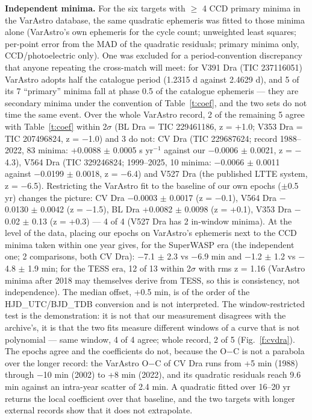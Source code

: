 \documentclass{aa}
\begin{document}
\textbf{Independent minima.} For the six targets with $\ge$ 4 CCD primary minima in the VarAstro database, the same quadratic ephemeris was fitted to those minima alone (VarAstro's own ephemeris for the cycle count; unweighted least squares; per-point error from the MAD of the quadratic residuals; primary minima only, CCD/photoelectric only). One was excluded for a period-convention discrepancy that anyone repeating the cross-match will meet: for V391 Dra (TIC 237116051) VarAstro adopts half the catalogue period (1.2315 d against 2.4629 d), and 5 of its 7 ``primary'' minima fall at phase 0.5 of the catalogue ephemeris --- they are secondary minima under the convention of Table~\ref{t:coef}, and the two sets do not time the same event. Over the whole VarAstro record, 2 of the remaining 5 agree with Table~\ref{t:coef} within 2$\sigma$ (BL Dra = TIC 229461186, z = +1.0; V353 Dra = TIC 207496824, z = $-$1.0) and 3 do not: CV Dra (TIC 229687624; record 1988--2022, 83 minima: +0.0088 $\pm$ 0.0005 s yr$^{-1}$ against our $-$0.0006 $\pm$ 0.0021, z = $-$4.3), V564 Dra (TIC 329246824; 1999--2025, 10 minima: $-$0.0066 $\pm$ 0.0011 against $-$0.0199 $\pm$ 0.0018, z = $-$6.4) and V527 Dra (the published LTTE system, z = $-$6.5). Restricting the VarAstro fit to the baseline of our own epochs ($\pm$0.5 yr) changes the picture: CV Dra $-$0.0003 $\pm$ 0.0017 (z = $-$0.1), V564 Dra $-$0.0130 $\pm$ 0.0042 (z = $-$1.5), BL Dra +0.0082 $\pm$ 0.0098 (z = +0.1), V353 Dra $-$0.02 $\pm$ 0.13 (z = +0.3) --- 4 of 4 (V527 Dra has 2 in-window minima). At the level of the data, placing our epochs on VarAstro's ephemeris next to the CCD minima taken within one year gives, for the SuperWASP era (the independent one; 2 comparisons, both CV Dra): $-$7.1 $\pm$ 2.3 vs $-$6.9 min and $-$1.2 $\pm$ 1.2 vs $-$4.8 $\pm$ 1.9 min; for the TESS era, 12 of 13 within 2$\sigma$ with rms z = 1.16 (VarAstro minima after 2018 may themselves derive from TESS, so this is consistency, not independence). The median offset, +0.5 min, is of the order of the HJD\_UTC/BJD\_TDB conversion and is not interpreted.
The window-restricted test is the demonstration: it is not that our measurement disagrees with the archive's, it is that the two fits measure different windows of a curve that is not polynomial --- same window, 4 of 4 agree; whole record, 2 of 5 (Fig.~\ref{f:cvdra}). The epochs agree and the coefficients do not, because the O$-$C is not a parabola over the longer record: the VarAstro O$-$C of CV Dra runs from +5 min (1988) through $-$10 min (2002) to +8 min (2022), and its quadratic residuals reach 9.6 min against an intra-year scatter of 2.4 min. A quadratic fitted over 16--20 yr returns the local coefficient over that baseline, and the two targets with longer external records show that it does not extrapolate.
\end{document}
